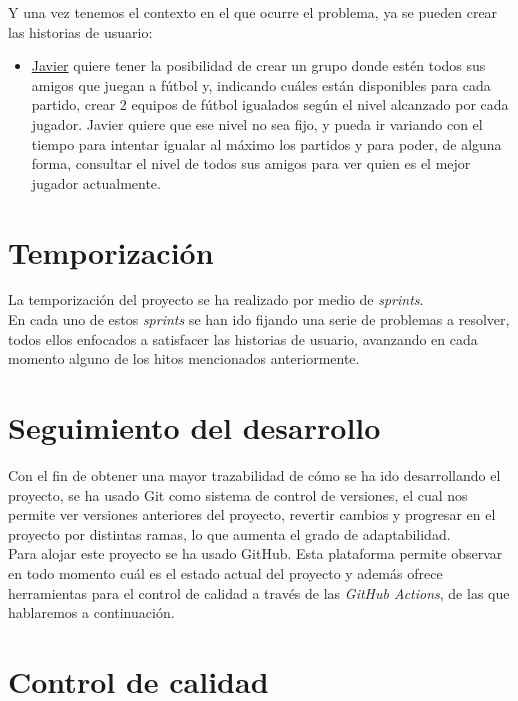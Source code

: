 Y una vez tenemos el contexto en el que ocurre el problema, ya se pueden crear las historias de usuario:

\begin{itemize}
    \item \href{https://github.com/manujurado1/SportsBar-IV/issues/107}{Javier} quiere tener la posibilidad de crear un grupo donde estén todos sus amigos que juegan a fútbol y, indicando cuáles están disponibles para cada partido, crear 2
    equipos de fútbol igualados según el nivel alcanzado por cada jugador. Javier quiere que ese nivel no sea fijo, y pueda ir variando con el tiempo para intentar igualar
    al máximo los partidos y para poder, de alguna forma, consultar el nivel de todos sus amigos para ver quien es el mejor jugador actualmente.
\end{itemize}

\newpage
\section{Temporización}

La temporización del proyecto se ha realizado por medio de \textit{sprints}.\\

En cada uno de estos \textit{sprints} se han ido fijando una serie de problemas a resolver, todos ellos enfocados a satisfacer las historias de usuario, avanzando en cada momento
alguno de los hitos mencionados anteriormente.


\section{Seguimiento del desarrollo}

Con el fin de obtener una mayor trazabilidad de cómo se ha ido desarrollando el proyecto, se ha usado Git como sistema de control de versiones, el cual nos permite ver versiones anteriores
del proyecto, revertir cambios y progresar en el proyecto por distintas ramas, lo que aumenta el grado de adaptabilidad.\\

Para alojar este proyecto se ha usado GitHub. Esta plataforma permite observar en todo momento cuál es el estado actual del proyecto y además ofrece herramientas para el control de calidad
a través de las \textit{GitHub Actions}, de las que hablaremos a continuación.


\section {Control de calidad}


